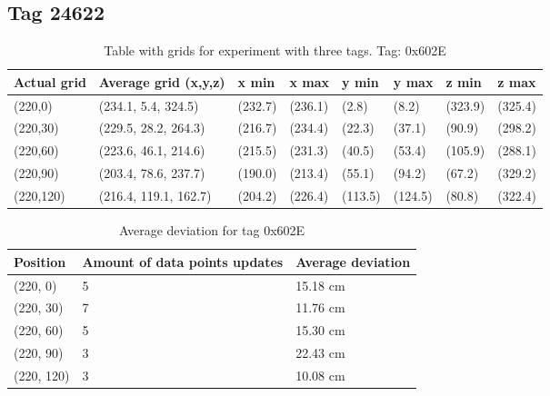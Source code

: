 \subsection{Tag 24622}
\begin{table}[H] 
    \centering
    \begin{tabular}{|l|l|l|l|l|l|l|l|}
        \hline
        Actual grid & Average grid (x,y,z)  & x min   & x max   & y min   & y max   & z min   & z max   \\ \hline
        (220,0)     & (234.1, 5.4, 324.5)   & (232.7) & (236.1) & (2.8)   & (8.2)   & (323.9) & (325.4) \\ \hline
        (220,30)    & (229.5, 28.2, 264.3)  & (216.7) & (234.4) & (22.3)  & (37.1)  & (90.9)  & (298.2) \\ \hline
        (220,60)    & (223.6, 46.1, 214.6)  & (215.5) & (231.3) & (40.5)  & (53.4)  & (105.9) & (288.1) \\ \hline
        (220,90)    & (203.4, 78.6, 237.7)  & (190.0) & (213.4) & (55.1)  & (94.2)  & (67.2)  & (329.2) \\ \hline
        (220,120)   & (216.4, 119.1, 162.7) & (204.2) & (226.4) & (113.5) & (124.5) & (80.8)  & (322.4) \\ \hline
    \end{tabular}
    \caption{Table with grids for experiment with three tags. Tag: 0x602E}
    \label{Tab:three-tag-experiment-result-tag-0x602E}
\end{table}

\begin{table}[H]
    \centering
    \begin{tabular}{|l|l|l|}
        \hline
        Position   & Amount of data points updates & Average deviation \\ \hline
        (220, 0)   & 5                             & 15.18 cm          \\ \hline
        (220, 30)  & 7                             & 11.76 cm          \\ \hline
        (220, 60)  & 5                             & 15.30 cm          \\ \hline
        (220, 90)  & 3                             & 22.43 cm          \\ \hline
        (220, 120) & 3                             & 10.08 cm          \\ \hline
    \end{tabular}
    \caption{Average deviation for tag 0x602E}
\end{table}


